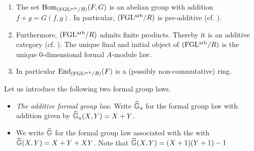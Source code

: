 \documentclass[../main.tex]{subfiles}
\begin{document}
\begin{lem}\label{lem:FGLAdditive}
  \begin{enumerate}
    \item The set $\operatorname{Hom}_{{(\mathrm{FGL^{arb}}/{R})}} (F,G)$
      is an abelian group with addition $f+g = G(f,g)$. 
      In particular, ${(\mathrm{FGL^{arb}}/{R})}$ is pre-additive (cf.
      \cite[\href{https://stacks.math.columbia.edu/tag/00ZY}{Tag
      00ZY}]{stacks-project}).     
    \item Furthermore, ${(\mathrm{FGL^{arb}}/{R})}$ admits finite products. Thereby it is 
      an additive category (cf. \cite[\href{https://stacks.math.columbia.edu/tag/0104}{Tag
      0104}]{stacks-project}).
      The unique final and initial object of ${(\mathrm{FGL^{arb}}/{R})}$ is the unique
      $0$-dimensional formal $A$-module law.
    \item In particular $\operatorname{End}_{{(\mathrm{FGL^{arb}}/{R})}}(F)$ is a (possibly non-commutative)
      ring.
  \end{enumerate}
\end{lem}

\begin{xpl} Let us introduce the following two formal group laws.
  \begin{itemize}
    \item \textit{The additive formal group law}. Write 
      $\widehat{\mathbb{G}}_a$ for the formal group law with addition given by 
      $\widehat{\mathbb{G}}_a(X,Y) = X + Y$. 
    \item We write $\widehat{\mathbb{G}}$ for the formal group law associated with the 
      with $\widehat{\mathbb{G}}(X,Y) = X + Y + XY$. Note that $\widehat{\mathbb{G}}(X,Y) = (X+1)(Y+1) - 1$
  \end{itemize}
\end{xpl}
\end{document}
